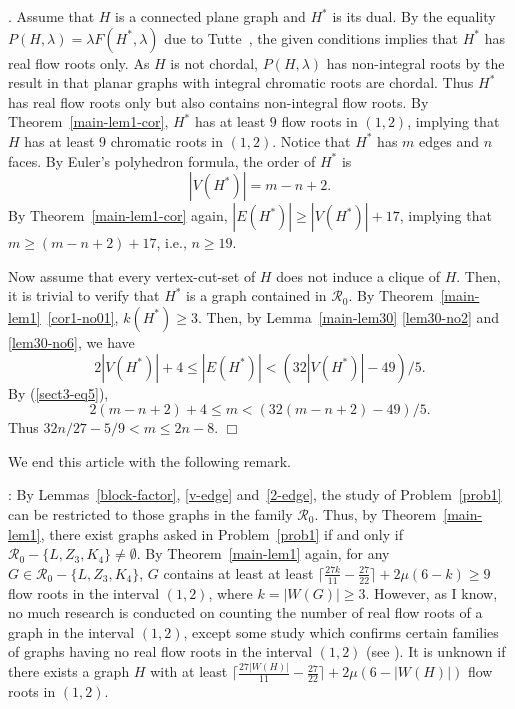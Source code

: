 \documentclass[11pt]{article}
\newcommand {\red} {\textcolor{red}}
\newcommand{\proof}
{{\noindent {\em Proof}.\quad}\setcounter{countclaim}{0}
\setcounter{countcase}{0}}
\newcommand{\proofend}{{\hfill$\Box$}}
\newcounter{countclaim}
\newcounter{countcase}
\def \setgr {\mathscr{R}}
\newcommand \nroot[1] 
{{\lceil \frac{27 #1}{11} -\frac{27}{22}\rceil+2\mu(6-#1)}}
\newcommand {\relabel}[1] {\label{#1} \red{[*: #1]}}\newcommand {\rebibitem}[1] {\bibitem{#1} \red{[*: #1]}}%
\def\relabel {\label} \def\rebibitem {\bibitem}  %
\begin{document}
\proof Assume that $H$ is a connected plane graph 
and $H^*$ is its dual. 
By the equality $P(H,\lambda)=\lambda F(H^{* },\lambda)$
due to Tutte~\cite{tut3},
the given conditions 
implies that $H^*$ has real flow roots only.
As $H$ is not chordal,
$P(H,\lambda)$ has non-integral roots
by the result in \cite{dong4} 
that planar graphs with integral
chromatic roots are chordal.
Thus $H^*$ has real flow roots only 
but also contains non-integral flow roots. 
By Theorem~\ref{main-lem1-cor}, 
$H^{* }$ has at least $9$ flow roots in $(1,2)$,
implying that 
$H$ has at least $9$ chromatic roots in $(1,2)$.
Notice that  $H^*$ has $m$ edges and $n$ faces. 
By Euler's polyhedron formula, the order of $H^*$ is  
\begin{equation}\relabel{sect3-eq5}
|V(H^*)|=m-n+2.
\end{equation}
By Theorem~\ref{main-lem1-cor} again, 
$|E(H^{* })|\ge |V(H^{* })|+17$, implying that 
$m\ge (m-n+2)+17$, i.e.,  $n\ge 19$. 

Now assume that every vertex-cut-set of $H$ does not 
induce a clique of $H$.
Then, it is trivial to verify that 
$H^*$ is a graph contained in $\setgr_0$.  
By Theorem~\ref{main-lem1}~\ref{cor1-no01}, $k(H^*)\ge 3$. 
Then, by  
Lemma~\ref{main-lem30} \ref{lem30-no2} and \ref{lem30-no6}, 
we have
\begin{equation}\relabel{sect3-eq06} 
2|V(H^*)|+4\le |E(H^*)|<(32|V(H^*)|-49)/5.
\end{equation}
By (\ref{sect3-eq5}), 
\begin{equation}\relabel{sect3-eq6}
2(m-n+2)+4\le m<(32(m-n+2)-49)/5.
\end{equation}
Thus $32n/27-5/9< m\le 2n-8$. 
\proofend


We end  this article with the following remark.

: 
By Lemmas~\ref{block-factor}, \ref{v-edge} and~\ref{2-edge},
the study of Problem~\ref{prob1} can be restricted to 
those graphs  in the family $\setgr_0$.
Thus, by Theorem~\ref{main-lem1}, 
there exist graphs asked in Problem~\ref{prob1} 
if and only if $\setgr_0-\{L, Z_3, K_4\}\ne \emptyset$.
By Theorem~\ref{main-lem1} again, 
for any $G\in \setgr_0-\{L, Z_3, K_4\}$, 
$G$ contains at least 
at least $\nroot{k}\ge 9$ 
flow roots in the interval $(1,2)$, where $k=|W(G)|\ge 3$.
However, as I know, 
no much research is conducted on 
counting the number of real flow roots of a graph 
in the interval $(1,2)$, 
except some study which confirms 
certain families of graphs having 
no real flow roots in the interval $(1,2)$
(see \cite{dong1, dong2, jac2,jac3,jac4}). 
It is unknown if there exists a graph $H$ 
with at least $\nroot{|W(H)|}$ flow roots in $(1,2)$.
\end{document}
